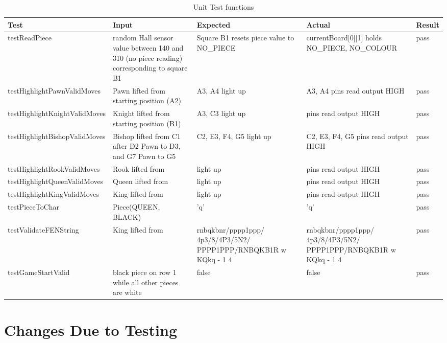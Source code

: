 \documentclass[12pt, titlepage]{article}
\begin{document}
\begin{table}[H]
  \centering
    \setlength{\leftmargini}{0cm}
    \begin{tabular}{| >{\centering\arraybackslash}m{6cm} | 
        >{\centering\arraybackslash}m{4cm} | 
        >{\centering\arraybackslash}m{3.5cm} | 
        >{\centering\arraybackslash}m{3.5cm} |
        >{\centering\arraybackslash}m{1.5cm} |}
    \hline
    \rowcolor[gray]{0.9}
    Test & Input & Expected & Actual & Result\\
    \hline
    testReadPiece & random Hall sensor value between 140 and 310 (no piece reading) corresponding to square B1 & Square B1 resets piece value to NO\_PIECE & currentBoard[0][1] holds NO\_PIECE, NO\_COLOUR  & pass \\
    \hline
    testHighlightPawnValidMoves & Pawn lifted from starting position (A2) & A3, A4 light up & A3, A4 pins read output HIGH & pass \\
    \hline
    testHighlightKnightValidMoves & Knight lifted from starting position (B1)& A3, C3 light up & pins read output HIGH & pass \\
    \hline
    testHighlightBishopValidMoves & Bishop lifted from C1 after D2 Pawn to D3, and G7 Pawn to G5 & C2, E3, F4, G5 light up & C2, E3, F4, G5 pins read output HIGH & pass \\
    \hline
    testHighlightRookValidMoves & Rook lifted from & light up & pins read output HIGH & pass \\
    \hline
    testHighlightQueenValidMoves & Queen lifted from & light up & pins read output HIGH & pass \\
    \hline
    testHighlightKingValidMoves & King lifted from & light up & pins read output HIGH & pass \\
    \hline
    testPieceToChar & Piece(QUEEN, BLACK) & 'q' & 'q' & pass \\
    \hline
    testValidateFENString & King lifted from & {\scriptsize rnbqkbnr/pppp1ppp/ 4p3/8/4P3/5N2/ PPPP1PPP/RNBQKB1R w KQkq - 1 4} & {\scriptsize rnbqkbnr/pppp1ppp/ 4p3/8/4P3/5N2/ PPPP1PPP/RNBQKB1R w KQkq - 1 4} & pass \\
    \hline
    testGameStartValid & black piece on row 1 while all other pieces are white & false & false & pass \\
    \hline
    \end{tabular}
  \caption{Unit Test functions}
\end{table}
\restoregeometry

\section{Changes Due to Testing}
\end{document}
